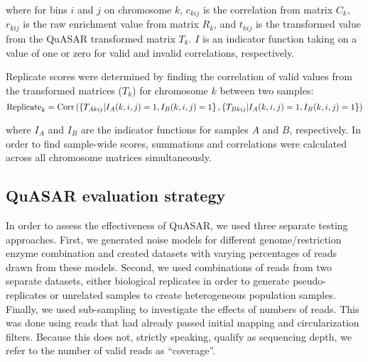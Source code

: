 where for bins $i$ and $j$ on chromosome $k$, $c_{kij}$ is the correlation from matrix $C_k$, $r_{kij}$ is the raw enrichment value from matrix $R_k$, and $t_{kij}$ is the transformed value from the QuASAR transformed matrix $T_k$. $I$ is an indicator function taking on a value of one or zero for valid and invalid correlations, respectively.

Replicate scores were determined by finding the correlation of valid values from the transformed matrices ($T_k$) for chromosome $k$ between two samples:
\[\textnormal{Replicate}_{k}=\textnormal{Corr}\left(\left\{T_{Akij}|I_A(k,i,j)=1,I_B(k,i,j)=1\right\},\left\{T_{Bkij}|I_A(k,i,j)=1,I_B(k,i,j)=1\right\}\right)\]

where $I_A$ and $I_B$ are the indicator functions for samples $A$ and $B$, respectively. In order to find sample-wide scores, summations and correlations were calculated across all chromosome matrices simultaneously.


\subsection{QuASAR evaluation strategy}

In order to assess the effectiveness of QuASAR, we used three separate testing approaches. First, we generated noise models for different genome/restriction enzyme combination and created datasets with varying percentages of reads drawn from these models. Second, we used combinations of reads from two separate datasets, either biological replicates in order to generate pseudo-replicates or unrelated samples to create heterogeneous population samples. Finally, we used sub-sampling to investigate the effects of numbers of reads. This was done using \cis reads that had already passed initial mapping and circularization filters. Because this does not, strictly speaking, qualify as sequencing depth, we refer to the number of valid \cis reads as ``coverage''.

